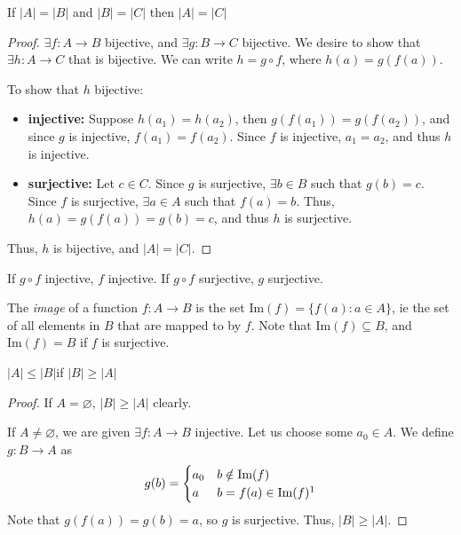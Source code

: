 \documentclass[12pt,oneside]{article}
\begin{document}
\begin{proposition}
  If $|A| = |B|$ and $|B| = |C|$ then $|A|=|C|$
\end{proposition}

\begin{proof}[Proof]
  $\exists f: A \to B$ bijective, and $\exists g: B \to C$ bijective. We desire to show that $\exists h : A \to C$ that is bijective. We can write $h = g \circ f$, where $h(a) = g(f(a))$. 

  To show that $h$ bijective:
  \begin{itemize}
    \item \textbf{injective:} Suppose $h(a_1) = h(a_2)$, then $g(f(a_1)) = g(f(a_2))$, and since $g$ is injective, $f(a_1) = f(a_2)$. Since $f$ is injective, $a_1 = a_2$, and thus $h$ is injective.
    \item \textbf{surjective:} Let $c \in C$. Since $g$ is surjective, $\exists b \in B$ such that $g(b) = c$. Since $f$ is surjective, $\exists a \in A$ such that $f(a) = b$. Thus, $h(a) = g(f(a)) = g(b) = c$, and thus $h$ is surjective.
  \end{itemize}
  Thus, $h$ is bijective, and $|A|=|C|$.
\end{proof}

\begin{lemma}
  If $g \circ f$ injective, $f$ injective. If $g \circ f$ surjective, $g$ surjective.
\end{lemma}

\begin{definition}[Image]
  The \emph{image} of a function $f: A \to B$ is the set $\text{Im}(f) = \{f(a) : a \in A\}$, ie the set of all elements in $B$ that are mapped to by $f$. Note that $\text{Im}(f) \subseteq B$, and $\text{Im}(f) = B$ if $f$ is surjective.
\end{definition}

\begin{proposition}
  $|A|\leq |B|$if $ |B| \geq |A|$  
\end{proposition}
  
\begin{proof}[Proof]
  If $A = \varnothing$, $|B|\geq |A|$ clearly.

  If $A \neq \varnothing$, we are given $\exists f: A \to B$ injective. Let us choose some $a_0 \in A$. We define $g: B \to A$ as \[g(b) = \begin{cases}
    a_0 & b \notin \text{Im}(f)\\
    a & b =f(a)\in \text{Im}(f)\footnotemark
  \end{cases}\] Note that $g(f(a)) = g(b) = a$, so $g$ is surjective. Thus, $|B| \geq |A|$.
\end{proof}
\end{document}
